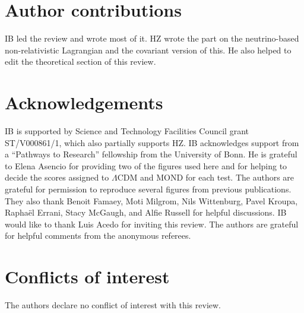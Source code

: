 \documentclass[fleqn,usenatbib,useAMS,onecolumn]{mnras} %
\begin{document}
\section*{Author contributions}

IB led the review and wrote most of it. HZ wrote the part on the neutrino-based non-relativistic Lagrangian and the covariant version of this. He also helped to edit the theoretical section of this review.



\section*{Acknowledgements}
\label{Acknowledgements}

IB is supported by Science and Technology Facilities Council grant ST/V000861/1, which also partially supports HZ. IB acknowledges support from a ``Pathways to Research'' fellowship from the University of Bonn. He is grateful to Elena Asencio for providing two of the figures used here and for helping to decide the scores assigned to $\Lambda$CDM and MOND for each test. The authors are grateful for permission to reproduce several figures from previous publications. They also thank Benoit Famaey, Moti Milgrom, Nils Wittenburg, Pavel Kroupa, Rapha\"{e}l Errani, Stacy McGaugh, and Alfie Russell for helpful discussions. IB would like to thank Luis Acedo for inviting this review. The authors are grateful for helpful comments from the anonymous referees.





\section*{Conflicts of interest}

The authors declare no conflict of interest with this review.







\bsp
\label{lastpage}
\end{document}
